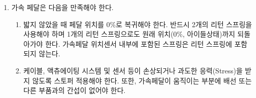 \documentclass[final,a4paper,10pt]{report}
\begin{document}
\begin{enumerate}
\begin{enumerate}
      \item\label{rule:formula-technical.components.accelerator-pedal.return-and-protection} 가속 페달은 다음을 만족해야 한다.
        \begin{enumerate}
          \item\label{rule:formula-technical.components.accelerator-pedal.return-and-protection.dual-return-springs} 밟지 않았을 때 페달 위치를 0\%로 복귀{\color{blue}해야 한다. 반드시 2개의 리턴 스프링을 사용해야 하며 1개의 리턴 스프링으로도 원래 위치(0\%, 아이들상태)까지 되돌아가야 한다. 가속페달 위치센서 내부에 포함된 스프링은 리턴 스프링에 포함되지 않는다.}
          \item\label{rule:formula-technical.components.accelerator-pedal.return-and-protection.stopper-and-no-interference} 케이블, 액츄에이팅 시스템 및 센서 등이 손상되거나 과도한 응력(Stress)을 받지 않도록 스토퍼 적용{\color{blue}해야 한다. 또한, 가속페달이 움직이는 부분에 배선 또는 다른 부품과의 간섭이 없어야 한다.}
        \end{enumerate}
    \end{enumerate}


\end{enumerate}
\end{document}
